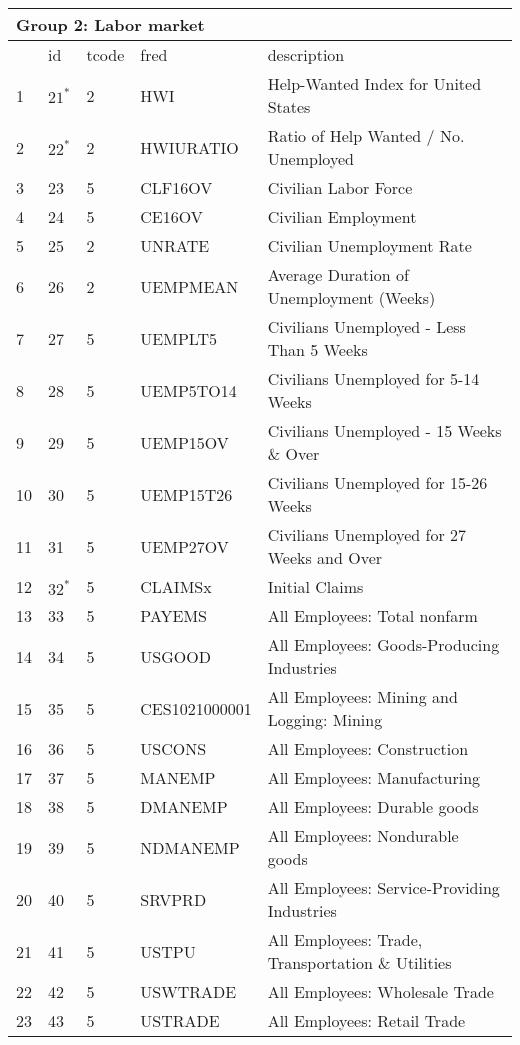 \begin{table}[ht] 
\centering 
\begin{tabular}{lllll}
\multicolumn{5}{l}{Group 2: Labor market} \\
\toprule
 & id & tcode & fred & description \\
\midrule
1 & $21^*$ & 2 & HWI & Help-Wanted Index for United States \\
2 & $22^*$ & 2 & HWIURATIO & Ratio of Help Wanted / No. Unemployed \\
3 & 23 & 5 & CLF16OV & Civilian Labor Force \\
4 & 24 & 5 & CE16OV & Civilian Employment \\
5 & 25 & 2 & UNRATE & Civilian Unemployment Rate \\
6 & 26 & 2 & UEMPMEAN & Average Duration of Unemployment (Weeks) \\
7 & 27 & 5 & UEMPLT5 & Civilians Unemployed - Less Than 5 Weeks \\
8 & 28 & 5 & UEMP5TO14 & Civilians Unemployed for 5-14 Weeks \\
9 & 29 & 5 & UEMP15OV & Civilians Unemployed - 15 Weeks \& Over \\
10 & 30 & 5 & UEMP15T26 & Civilians Unemployed for 15-26 Weeks \\
11 & 31 & 5 & UEMP27OV & Civilians Unemployed for 27 Weeks and Over \\
12 & $32^*$ & 5 & CLAIMSx & Initial Claims \\
13 & 33 & 5 & PAYEMS & All Employees: Total nonfarm \\
14 & 34 & 5 & USGOOD & All Employees: Goods-Producing Industries \\
15 & 35 & 5 & CES1021000001 & All Employees: Mining and Logging: Mining \\
16 & 36 & 5 & USCONS & All Employees: Construction \\
17 & 37 & 5 & MANEMP & All Employees: Manufacturing \\
18 & 38 & 5 & DMANEMP & All Employees: Durable goods \\
19 & 39 & 5 & NDMANEMP & All Employees: Nondurable goods \\
20 & 40 & 5 & SRVPRD & All Employees: Service-Providing Industries \\
21 & 41 & 5 & USTPU & All Employees: Trade, Transportation \& Utilities \\
22 & 42 & 5 & USWTRADE & All Employees: Wholesale Trade \\
23 & 43 & 5 & USTRADE & All Employees: Retail Trade \\

\end{tabular}
\end{table}
